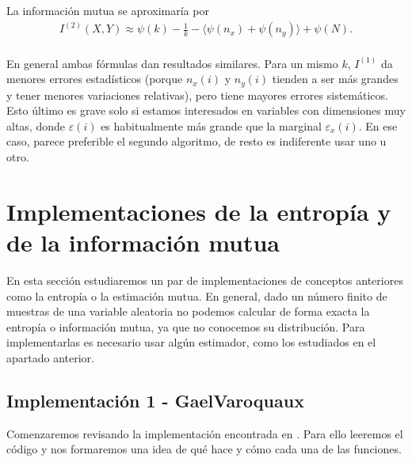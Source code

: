 \documentclass[12pt,a4paper]{report} %
\theoremstyle{definition}
\begin{document}
La información mutua se aproximaría por
\begin{align}
I^{(2)}(X,Y) \approx \psi(k) - \frac{1}{k} - \langle \psi(n_x) + \psi(n_y) \rangle + \psi(N). \label{eq:est2}
\end{align}\\[-10pt]


En general ambas fórmulas dan resultados similares. Para un mismo $k$, $I^{(1)}$ da menores errores estadísticos (porque $n_x(i)$ y $n_y(i)$ tienden a ser más grandes y tener menores variaciones relativas), pero tiene mayores errores sistemáticos. Esto último es grave solo si estamos interesados en variables con dimensiones muy altas, donde $\varepsilon(i)$ es habitualmente más grande que la marginal $\varepsilon_x(i)$. En ese caso, parece preferible el segundo algoritmo, de resto es indiferente usar uno u otro.\\

\section{Implementaciones de la entropía y de la información mutua}

En esta sección estudiaremos un par de implementaciones de conceptos anteriores como la entropía o la estimación mutua. En general, dado un número finito de muestras de una variable aleatoria no podemos calcular de forma exacta la entropía o información mutua, ya que no conocemos su distribución. Para implementarlas es necesario usar algún estimador, como los estudiados en el apartado anterior.

\subsection{Implementación 1 - GaelVaroquaux}

Comenzaremos revisando la implementación encontrada en \cite{estimating}. Para ello leeremos el código y nos formaremos una idea de qué hace y cómo cada una de las funciones.
\end{document}
